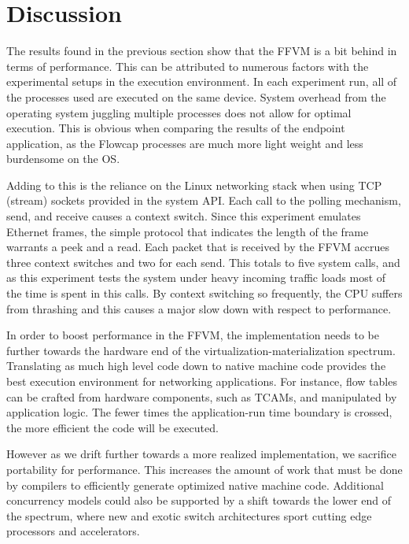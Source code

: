 \section{Discussion}
\label{expr:discussion}


The results found in the previous section show that the FFVM is a bit behind in
terms of performance. This can be attributed to numerous factors with the
experimental setups in the execution environment. In each experiment run, all
of the processes used are executed on the same device. System overhead from
the operating system juggling multiple processes does not allow for optimal
execution. This is obvious when comparing the results of the endpoint
application, as the Flowcap processes are much more light weight and less
burdensome on the OS.

Adding to this is the reliance on the Linux networking
stack when using TCP (stream) sockets provided in the system API. Each call to
the polling mechanism, send, and receive causes a context switch. Since this
experiment emulates Ethernet frames, the simple protocol that indicates the
length of the frame warrants a peek and a read. Each packet that
is received by the FFVM accrues three context switches and two for each send.
This totals to five system calls, and as this experiment tests the system under
heavy incoming traffic loads most of the time is spent in this calls. By context
switching so frequently, the CPU suffers from thrashing and this causes a major
slow down with respect to performance.


In order to boost performance in the FFVM, the implementation needs to be
further towards the hardware end of the virtualization-materialization spectrum.
Translating as much high level code down to native machine code provides the best
execution environment for networking applications. For instance, flow tables can
be crafted from hardware components, such as TCAMs, and manipulated by application
logic. The fewer times the application-run time boundary is crossed, the more
efficient the code will be executed.


However as we drift further towards a more realized implementation, we sacrifice
portability for performance. This increases the amount of work that must be done
by compilers to efficiently generate optimized native machine code. Additional
concurrency models could also be supported by a shift towards the lower end of
the spectrum, where new and exotic switch architectures sport cutting edge
processors and accelerators.

